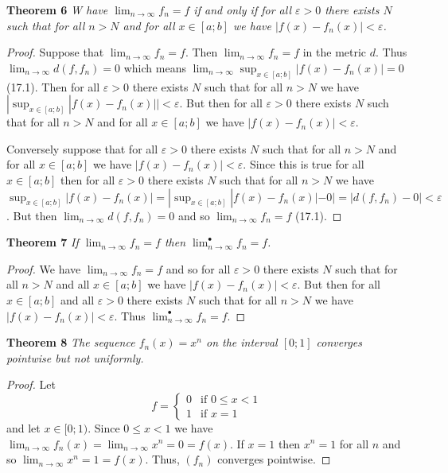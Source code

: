 \documentclass{article}
\begin{document}
\begin{flushleft}
\textbf{Theorem 6}
\textsl{W have $\lim_{n \rightarrow \infty} f_n = f$ if and only if for all $\varepsilon > 0$ there exists $N$ such that for all $n > N$ and for all $x \in [a;b]$ we have $|f(x) - f_n(x)| < \varepsilon$.}
\begin{proof}
Suppose that $\lim_{n \rightarrow \infty} f_n = f$. Then $\lim_{n \rightarrow \infty} f_n = f$ in the metric $d$. Thus $\lim_{n \rightarrow \infty} d(f,f_n) = 0$ which means $\lim_{n \rightarrow \infty} \sup_{x \in [a;b]} |f(x)-f_n(x)| = 0$ (17.1). Then for all $\varepsilon > 0$ there exists $N$ such that for all $n>N$ we have $|\sup_{x \in [a;b]} |f(x)-f_n(x)|| < \varepsilon$. But then for all $\varepsilon > 0$ there exists $N$ such that for all $n>N$ and for all $x \in [a;b]$ we have $|f(x) - f_n(x)| < \varepsilon$.\newline

Conversely suppose that for all $\varepsilon > 0$ there exists $N$ such that for all $n > N$ and for all $x \in [a;b]$ we have $|f(x) - f_n(x)| < \varepsilon$. Since this is true for all $x \in [a;b]$ then for all $\varepsilon > 0$ there exists $N$ such that for all $n>N$ we have $\sup_{x \in [a;b]} |f(x)-f_n(x)| = |\sup_{x \in [a;b]} |f(x)-f_n(x)| - 0| = |d(f,f_n) - 0| < \varepsilon$. But then $\lim_{n \rightarrow \infty} d(f,f_n) = 0$ and so $\lim_{n \rightarrow \infty} f_n = f$ (17.1).
\end{proof}

\textbf{Theorem 7}
\textsl{If $\lim_{n \rightarrow \infty} f_n = f$ then $\lim_{n \rightarrow \infty}^{\bullet} f_n = f$.}
\begin{proof}
We have $\lim_{n \rightarrow \infty} f_n = f$ and so for all $\varepsilon > 0$ there exists $N$ such that for all $n>N$ and all $x \in [a;b]$ we have $|f(x)-f_n(x)| < \varepsilon$. But then for all $x \in [a;b]$ and all $\varepsilon > 0$ there exists $N$ such that for all $n>N$ we have $|f(x)-f_n(x)| < \varepsilon$. Thus $\lim_{n \rightarrow \infty}^{\bullet} f_n = f$.
\end{proof}

\textbf{Theorem 8}
\textsl{The sequence $f_n(x) = x^n$ on the interval $[0;1]$ converges pointwise but not uniformly.}
\begin{proof}
Let
\[
f=
\begin{cases}
0 & \text{if $0 \leq x < 1$}\\
1 & \text{if $x=1$}
\end{cases}
\]
and let $x \in [0;1)$. Since $0 \leq x < 1$ we have $\lim_{n \rightarrow \infty} f_n(x) = \lim_{n \rightarrow \infty} x^n = 0 = f(x)$. If $x=1$ then $x^n = 1$ for all $n$ and so $\lim_{n \rightarrow \infty} x^n = 1 = f(x)$. Thus, $(f_n)$ converges pointwise.\newline


\end{proof}
\end{flushleft}
\end{document}
